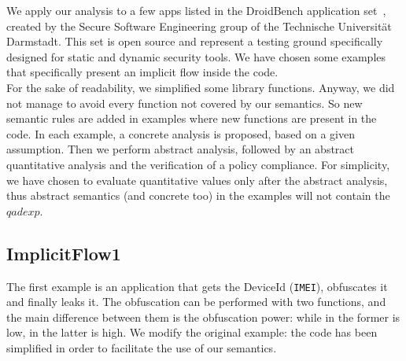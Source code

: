 \documentclass{llncs}
\begin{document}
\noindent We apply our analysis to a few apps listed in the DroidBench application set~\cite{DroidBench}, created by the Secure Software Engineering group of the Technische Universit\"{a}t Darmstadt. This set is open source and represent a testing ground specifically designed for static and dynamic security tools. We have chosen some examples that specifically present an implicit flow inside the code.\\
For the sake of readability, we simplified some library functions. Anyway, we did not manage to avoid every function not covered by our semantics. So new semantic rules are added in examples where new functions are present in the code. In each example, a concrete analysis is proposed, based on a given assumption. Then we perform abstract analysis, followed by an abstract quantitative analysis and the verification of a policy compliance. For simplicity, we have chosen to evaluate quantitative values only after the abstract analysis, thus abstract semantics (and concrete too) in the examples will not contain the $qadexp$.

\subsection{ImplicitFlow1}
The first example  is an application that gets the DeviceId (\texttt{IMEI}), obfuscates it and finally leaks it. The obfuscation can be performed with two functions, and the main difference between them is the obfuscation power: while in the former is low, in the latter is high.  We modify the original example: the code has been simplified in order to facilitate the use of our semantics.
\end{document}
